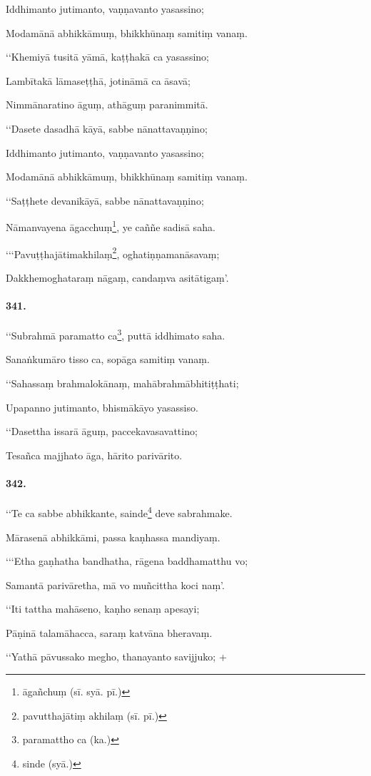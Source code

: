 Iddhimanto jutimanto, vaṇṇavanto yasassino;

Modamānā abhikkāmuṃ, bhikkhūnaṃ samitiṃ vanaṃ.

‘‘Khemiyā tusitā yāmā, kaṭṭhakā ca yasassino;

Lambītakā lāmaseṭṭhā, jotināmā ca āsavā;

Nimmānaratino āguṃ, athāguṃ paranimmitā.

‘‘Dasete dasadhā kāyā, sabbe nānattavaṇṇino;

Iddhimanto jutimanto, vaṇṇavanto yasassino;

Modamānā abhikkāmuṃ, bhikkhūnaṃ samitiṃ vanaṃ.

‘‘Saṭṭhete devanikāyā, sabbe nānattavaṇṇino;

Nāmanvayena āgacchuṃ\footnote{āgañchuṃ (sī. syā. pī.)}, ye caññe sadisā saha.

‘‘‘Pavuṭṭhajātimakhilaṃ\footnote{pavutthajātiṃ akhilaṃ (sī. pī.)}, oghatiṇṇamanāsavaṃ;

Dakkhemoghataraṃ nāgaṃ, candaṃva asitātigaṃ’.

\paragraph{341.}‘‘Subrahmā paramatto ca\footnote{paramattho ca (ka.)}, puttā iddhimato saha.

Sanaṅkumāro tisso ca, sopāga samitiṃ vanaṃ.

‘‘Sahassaṃ brahmalokānaṃ, mahābrahmābhitiṭṭhati;

Upapanno jutimanto, bhismākāyo yasassiso.

‘‘Dasettha issarā āguṃ, paccekavasavattino;

Tesañca majjhato āga, hārito parivārito.

\paragraph{342.}‘‘Te ca sabbe abhikkante, sainde\footnote{sinde (syā.)} deve sabrahmake.

Mārasenā abhikkāmi, passa kaṇhassa mandiyaṃ.

‘‘‘Etha gaṇhatha bandhatha, rāgena baddhamatthu vo;

Samantā parivāretha, mā vo muñcittha koci naṃ’.

‘‘Iti tattha mahāseno, kaṇho senaṃ apesayi;

Pāṇinā talamāhacca, saraṃ katvāna bheravaṃ.

‘‘Yathā pāvussako megho, thanayanto savijjuko; +

